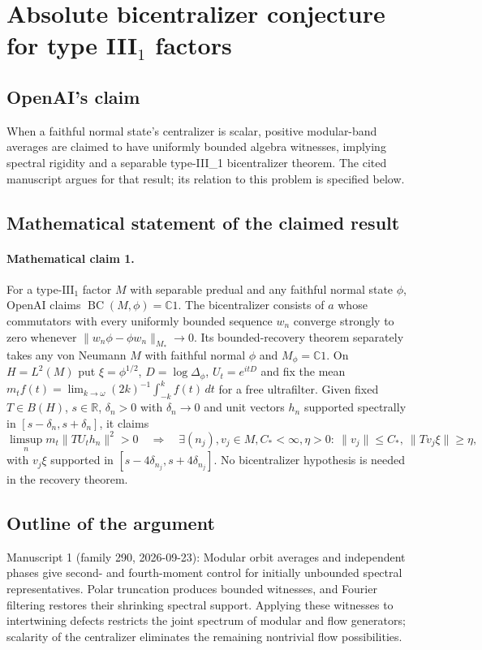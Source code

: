 \documentclass[11pt]{article}
\begin{document}
\section*{Absolute bicentralizer conjecture for type III\({}_{1}\) factors}

\subsection{OpenAI's claim}
When a faithful normal state's centralizer is scalar, positive modular-band averages are claimed to have uniformly bounded algebra witnesses, implying spectral rigidity and a separable type-III\_1 bicentralizer theorem. The cited manuscript argues for that result; its relation to this problem is specified below.

\subsection{Mathematical statement of the claimed result}
\paragraph{Mathematical claim 1.} For a type-$\mathrm{III}_1$ factor $M$ with separable predual and any faithful normal state $\phi$, OpenAI claims $\operatorname{BC}(M,\phi)=\mathbb C1$. The bicentralizer consists of $a$ whose commutators with every uniformly bounded sequence $w_n$ converge strongly to zero whenever $\|w_n\phi-\phi w_n\|_{M_*}\to0$.
Its bounded-recovery theorem separately takes any von Neumann $M$ with faithful normal $\phi$ and $M_\phi=\mathbb C1$. On $H=L^2(M)$ put $\xi=\phi^{1/2}$, $D=\log\Delta_\phi$, $U_t=e^{itD}$ and fix the mean $m_tf(t)=\lim_{k\to\omega}(2k)^{-1}\int_{-k}^kf(t)\,dt$ for a free ultrafilter. Given fixed $T\in B(H)$, $s\in\mathbb R$, $\delta_n>0$ with $\delta_n\to0$ and unit vectors $h_n$ supported spectrally in $[s-\delta_n,s+\delta_n]$, it claims
\[
\limsup_nm_t\|TU_th_n\|^2>0
\quad\Longrightarrow\quad
\exists(n_j),v_j\in M,C_*<\infty,\eta>0:\ \|v_j\|\le C_*,\ \|Tv_j\xi\|\ge\eta,
\]
with $v_j\xi$ supported in $[s-4\delta_{n_j},s+4\delta_{n_j}]$. No bicentralizer hypothesis is needed in the recovery theorem.

\subsection{Outline of the argument}
Manuscript 1 (family 290, 2026-09-23): Modular orbit averages and independent phases give second- and fourth-moment control for initially unbounded spectral representatives. Polar truncation produces bounded witnesses, and Fourier filtering restores their shrinking spectral support. Applying these witnesses to intertwining defects restricts the joint spectrum of modular and flow generators; scalarity of the centralizer eliminates the remaining nontrivial flow possibilities.
\end{document}
